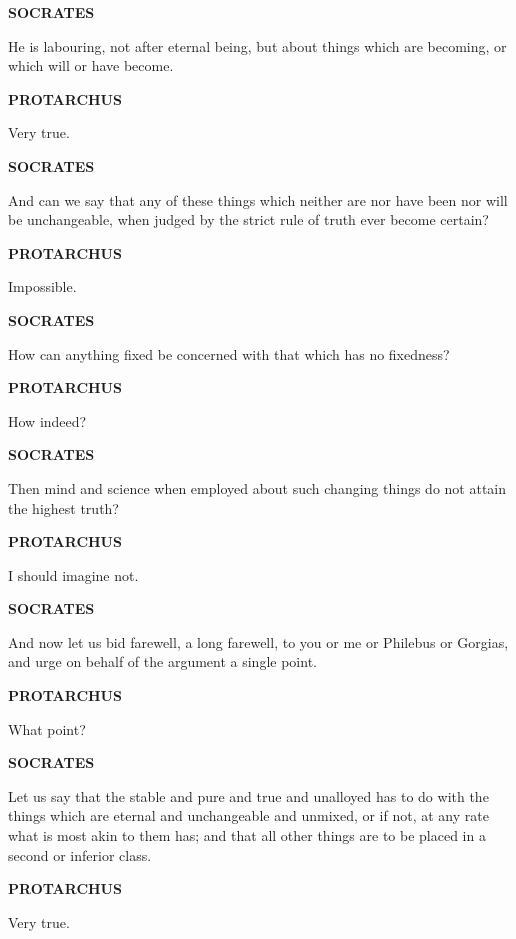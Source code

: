 \documentclass[11pt,letter]{article}
\begin{document}
\par \textbf{SOCRATES}
\par   He is labouring, not after eternal being, but about things which are becoming, or which will or have become.

\par \textbf{PROTARCHUS}
\par   Very true.

\par \textbf{SOCRATES}
\par   And can we say that any of these things which neither are nor have been nor will be unchangeable, when judged by the strict rule of truth ever become certain?

\par \textbf{PROTARCHUS}
\par   Impossible.

\par \textbf{SOCRATES}
\par   How can anything fixed be concerned with that which has no fixedness?

\par \textbf{PROTARCHUS}
\par   How indeed?

\par \textbf{SOCRATES}
\par   Then mind and science when employed about such changing things do not attain the highest truth?

\par \textbf{PROTARCHUS}
\par   I should imagine not.

\par \textbf{SOCRATES}
\par   And now let us bid farewell, a long farewell, to you or me or Philebus or Gorgias, and urge on behalf of the argument a single point.

\par \textbf{PROTARCHUS}
\par   What point?

\par \textbf{SOCRATES}
\par   Let us say that the stable and pure and true and unalloyed has to do with the things which are eternal and unchangeable and unmixed, or if not, at any rate what is most akin to them has; and that all other things are to be placed in a second or inferior class.

\par \textbf{PROTARCHUS}
\par   Very true.
\end{document}

